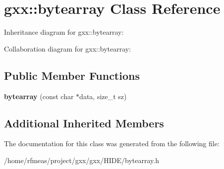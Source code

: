 \hypertarget{classgxx_1_1bytearray}{}\section{gxx\+:\+:bytearray Class Reference}
\label{classgxx_1_1bytearray}


Inheritance diagram for gxx\+:\+:bytearray\+:


Collaboration diagram for gxx\+:\+:bytearray\+:
\subsection*{Public Member Functions}
\begin{DoxyCompactItemize}
\item 
{\bfseries bytearray} (const char $\ast$data, size\+\_\+t sz)\hypertarget{classgxx_1_1bytearray_afcff02af3b1692e16a6db49d9303329e}{}\label{classgxx_1_1bytearray_afcff02af3b1692e16a6db49d9303329e}

\end{DoxyCompactItemize}
\subsection*{Additional Inherited Members}


The documentation for this class was generated from the following file\+:\begin{DoxyCompactItemize}
\item 
/home/rfmeas/project/gxx/gxx/\+H\+I\+D\+E/bytearray.\+h\end{DoxyCompactItemize}
